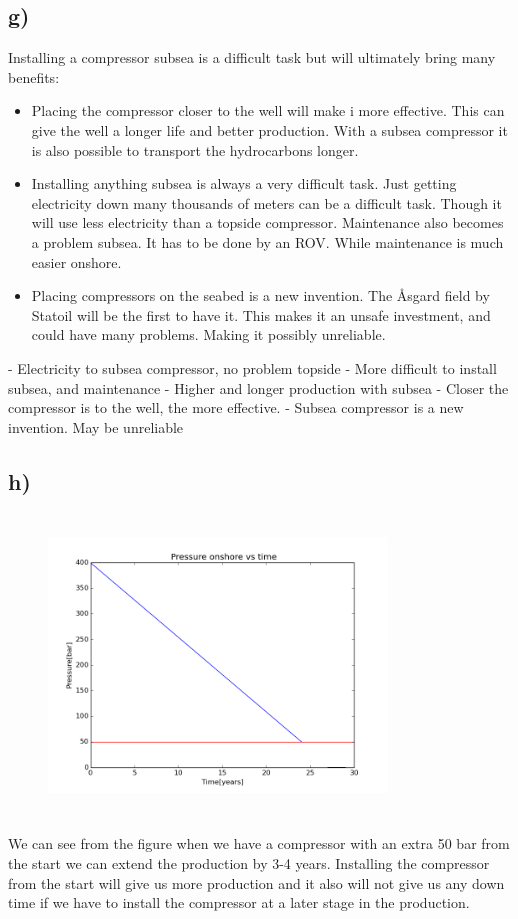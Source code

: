 \documentclass[DIV=calc, paper=a4, fontsize=13pt, twocolumn]{scrartcl}	 %
\begin{document}
\subsection*{g)}
Installing a compressor subsea is a difficult task but will ultimately bring many benefits:
\begin{itemize}
\item Placing the compressor closer to the well will make i more effective. This can give the well a longer life and better production. With a subsea compressor it is also possible to transport the hydrocarbons longer.
\item Installing anything subsea is always a very difficult task. Just getting electricity down many thousands of meters can be a difficult task. Though it will use less electricity than a topside compressor. Maintenance also becomes a problem subsea. It has to be done by an ROV. While maintenance is much easier onshore.
\item Placing compressors on the seabed is a new invention. The Åsgard field by Statoil will be the first to have it. This makes it an unsafe investment, and could have many problems. Making it possibly unreliable.
\end{itemize}
- Electricity to subsea compressor, no problem topside
- More difficult to install subsea, and maintenance 
- Higher and longer production with subsea
- Closer the compressor is to the well, the more effective.
- Subsea compressor is a new invention. May be unreliable

\subsection*{h)}
\begin{figure}[h]
\includegraphics[width=9cm,height=8cm]{Pressure_compressor.png}
\end{figure}
We can see from the figure when we have a compressor with an extra 50 bar from the start we can extend the production by 3-4 years. Installing the compressor from the start will give us more production and it also will not give us any down time if we have to install the compressor at a later stage in the production. 
\end{document}
